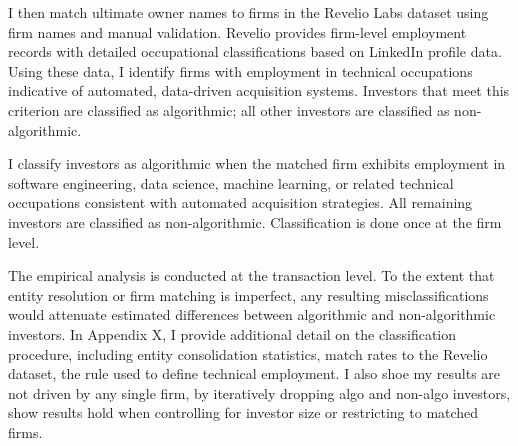\documentclass[11pt]{article}
\newcommand{\LR}[1]{{\color{blue}{[LR: #1]}}}
\begin{document}
I then match ultimate owner names to firms in the Revelio Labs dataset using firm names and manual validation. Revelio provides firm-level employment records with detailed occupational classifications based on LinkedIn profile data. Using these data, I identify firms with employment in technical occupations indicative of automated, data-driven acquisition systems. Investors that meet this criterion are classified as algorithmic; all other investors are classified as non-algorithmic.

I classify investors as algorithmic when the matched firm exhibits employment in software engineering, data science, machine learning, or related technical occupations consistent with automated acquisition strategies. All remaining investors are classified as non-algorithmic. Classification is done once at the firm level. 

\LR{Add in where this robustness takes place}
The empirical analysis is conducted at the transaction level. To the extent that entity resolution or firm matching is imperfect, any resulting misclassifications would attenuate estimated differences between algorithmic and non-algorithmic investors. In Appendix X, I provide additional detail on the classification procedure, including entity consolidation statistics, match rates to the Revelio dataset, the rule used to define technical employment. I also shoe my results are not driven by any single firm, by iteratively dropping algo and non-algo investors, show results hold when controlling for investor size or restricting to matched firms.  


\end{document}
